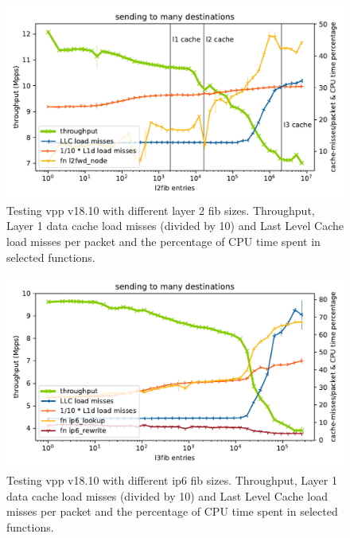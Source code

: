 \begin{figure}[!ht]
\noindent\hspace{0.5mm}\includegraphics[width=\linewidth]{pics/throughput_l2_throughmac_klaipeda32ghz_v3.pdf}
\caption{Testing \Ac{vpp} v18.10 with different layer 2 \Ac{fib} sizes. Throughput, Layer 1 data cache load misses (divided by 10) and Last Level Cache load misses per packet and the percentage of CPU time spent in selected functions. }
\label{graph:l2fib}
\end{figure}

\begin{figure}[!ht]
\noindent\hspace{0.5mm}\includegraphics[width=\linewidth]{pics/throughput_l3v6_routes_klaipeda32ghz_v3.pdf}
\caption{Testing \Ac{vpp} v18.10 with different \Ac{ip6} \Ac{fib} sizes. Throughput, Layer 1 data cache load misses (divided by 10) and Last Level Cache load misses per packet and the percentage of CPU time spent in selected functions. }
\label{graph:ip6fib}
\end{figure}

